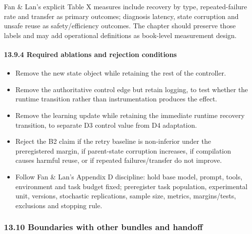 Fan \& Lan's explicit Table X measures include recovery by type, repeated-failure rate and transfer as primary outcomes; diagnosis latency, state corruption and unsafe reuse as safety/efficiency outcomes. The chapter should preserve those labels and may add operational definitions as book-level measurement design.

\paragraph{13.9.4 Required ablations and rejection conditions}\label{required-ablations-and-rejection-conditions}

\begin{itemize}
\tightlist
\item
  Remove the new state object while retaining the rest of the controller.
\item
  Remove the authoritative control edge but retain logging, to test whether the runtime transition rather than instrumentation produces the effect.
\item
  Remove the learning update while retaining the immediate runtime recovery transition, to separate D3 control value from D4 adaptation.
\item
  Reject the B2 claim if the retry baseline is non-inferior under the preregistered margin, if parent-state corruption increases, if compilation causes harmful reuse, or if repeated failures/transfer do not improve.
\item
  Follow Fan \& Lan's Appendix D discipline: hold base model, prompt, tools, environment and task budget fixed; preregister task population, experimental unit, versions, stochastic replications, sample size, metrics, margins/tests, exclusions and stopping rule.
\end{itemize}

\subsubsection{13.10 Boundaries with other bundles and handoff}\label{boundaries-with-other-bundles-and-handoff}

